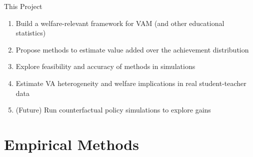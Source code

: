 \documentclass[11pt]{beamer}
\begin{document}

\begin{frame}{This Project}

\begin{enumerate}
    \item Build a welfare-relevant framework for VAM (and other educational statistics) 
    \item Propose methods to estimate value added over the achievement distribution
    \item Explore feasibility and accuracy of methods in simulations
    \item Estimate VA heterogeneity and welfare implications in real student-teacher data
    \item (Future) Run counterfactual policy simulations to explore gains
\end{enumerate}

\end{frame}





\section{Empirical Methods}

\end{document}
